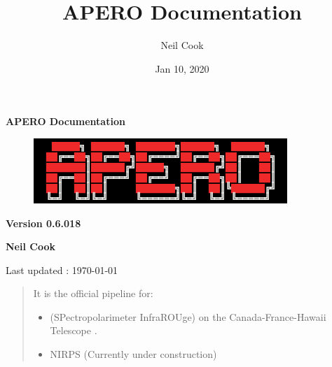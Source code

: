 \documentclass[a4paper,10pt,english]{report}
\title{APERO Documentation}
\date{Jan 10, 2020}
\author{Neil Cook}
\begin{document}
\pagestyle{empty}


        \begin{titlepage}
            \centering

            \vspace*{40mm} %
            \textbf{\Huge {APERO Documentation}}

            \vspace{5mm}
            \begin{figure}[!h]
                \centering
                \includegraphics[scale=1]{apero_logo.png}
            \end{figure}
            
            \vspace{5mm}
            \Large \textbf{Version 0.6.018}
            
            \vspace{5mm}
            \Large \textbf{{Neil Cook}}

            \vspace*{0mm}
            \small  Last updated : \MonthYearFormat\today


        \end{titlepage}

        \clearpage
        \tableofcontents

        
\pagestyle{plain}
 
\pagestyle{normal}
\label{\detokenize{index::doc}}

\begin{quote}

It is the official pipeline for:
\begin{itemize}
\item {} 
 (SPectropolarimeter InfraROUge) on the Canada-France-Hawaii Telescope .

\item {} 
NIRPS (Currently under construction)

\end{itemize}
\end{quote}
\end{document}
